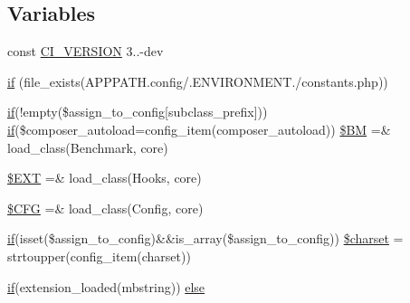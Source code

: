 \subsection*{Variables}
\begin{DoxyCompactItemize}
\item 
const \hyperlink{_admin_2system_2core_2_code_igniter_8php_a32e3c3927ba8ec93df92327dfd85d564}{C\+I\+\_\+\+V\+E\+R\+S\+I\+O\+N} \textquotesingle{}3..-\/dev\textquotesingle{}
\item 
\hyperlink{_admin_2system_2core_2_code_igniter_8php_a6503a8f8da73cafe64ad07639c198f54}{if} (file\+\_\+exists(A\+P\+P\+P\+A\+T\+H.\textquotesingle{}config/\textquotesingle{}.E\+N\+V\+I\+R\+O\+N\+M\+E\+N\+T.\textquotesingle{}/constants.\+php\textquotesingle{}))
\item 
\hyperlink{_admin_2assets_2js_2bootstrap_8min_8js_a87cf461060832b8b68a7b48d9e371e4f}{if}(!empty(\$assign\+\_\+to\+\_\+config\mbox{[}\textquotesingle{}subclass\+\_\+prefix\textquotesingle{}\mbox{]})) \hyperlink{_admin_2assets_2js_2bootstrap_8min_8js_a87cf461060832b8b68a7b48d9e371e4f}{if}(\$composer\+\_\+autoload=config\+\_\+item(\textquotesingle{}composer\+\_\+autoload\textquotesingle{})) \hyperlink{_admin_2system_2core_2_code_igniter_8php_a3efe5c22835162259cd530154490ade3}{\$\+B\+M} =\& load\+\_\+class(\textquotesingle{}Benchmark\textquotesingle{}, \textquotesingle{}core\textquotesingle{})
\item 
\hyperlink{_admin_2system_2core_2_code_igniter_8php_ab97aae9bc0aae04b84d360a29a3c035b}{\$\+E\+X\+T} =\& load\+\_\+class(\textquotesingle{}Hooks\textquotesingle{}, \textquotesingle{}core\textquotesingle{})
\item 
\hyperlink{_admin_2system_2core_2_code_igniter_8php_adb9373e11e42b2cd55d1fe249ae72deb}{\$\+C\+F\+G} =\& load\+\_\+class(\textquotesingle{}Config\textquotesingle{}, \textquotesingle{}core\textquotesingle{})
\item 
\hyperlink{_admin_2assets_2js_2bootstrap_8min_8js_a87cf461060832b8b68a7b48d9e371e4f}{if}(isset(\$assign\+\_\+to\+\_\+config)\&\&is\+\_\+array(\$assign\+\_\+to\+\_\+config)) \hyperlink{_admin_2system_2core_2_code_igniter_8php_acf3a97185c56fefd63af2d2af8676bd9}{\$charset} = strtoupper(config\+\_\+item(\textquotesingle{}charset\textquotesingle{}))
\item 
\hyperlink{_admin_2assets_2js_2bootstrap_8min_8js_a87cf461060832b8b68a7b48d9e371e4f}{if}(extension\+\_\+loaded(\textquotesingle{}mbstring\textquotesingle{})) \hyperlink{_admin_2system_2core_2_code_igniter_8php_ac5109000d551293e102a2bc06f29cda4}{else}

\end{DoxyCompactItemize}
